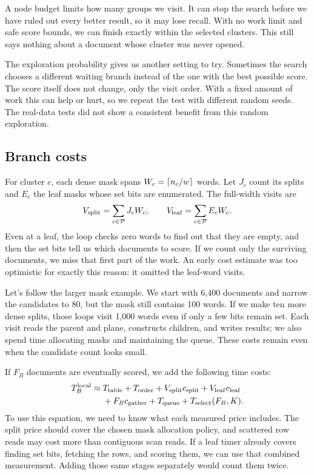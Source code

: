 A node budget limits how many groups we visit. It can stop the search before we have ruled
out every better result, so it may lose recall. With no work limit and safe score bounds,
we can finish exactly within the selected clusters. This still says nothing about a document
whose cluster was never opened.

The exploration probability gives us another setting to try. Sometimes the search chooses
a different waiting branch instead of the one with the best possible score. The score itself
does not change, only the visit order. With a fixed amount of work this can help or hurt,
so we repeat the test with different random seeds. The real-data tests did not show a
consistent benefit from this random exploration.

\subsection{Branch costs}
For cluster $c$, each dense mask spans $W_c=\left\lceil n_c/w\right\rceil$ words. Let $J_c$ count its splits
and $E_c$ the leaf masks whose set bits are enumerated. The full-width visits are
\begin{equation}
V_{\rm split}=\sum_{c\in\mathcal P}J_cW_c,
\qquad V_{\rm leaf}=\sum_{c\in\mathcal P}E_cW_c.
\label{eq:visits}
\end{equation}
Even at a leaf, the loop checks zero words to find out that they are empty, and then the set
bits tell us which documents to score. If we count only the surviving documents, we miss that
first part of the work. An early cost estimate was too optimistic for exactly this reason:
it omitted the leaf-word visits.

Let's follow the larger mask example. We start with 6,400 documents and narrow the candidates
to 80, but the mask still contains 100 words. If we make ten more dense splits, those loops
visit 1,000 words even if only a few bits remain set. Each visit reads the parent and plane,
constructs children, and writes results; we also spend time allocating masks and maintaining
the queue. These costs remain even when the candidate count looks small.

If $F_B$ documents are eventually scored, we add the following time costs:
\begin{equation}
\begin{split}
T_B^{\rm local}\approx{}&T_{\rm table}+T_{\rm order}
 +V_{\rm split}c_{\rm split}+V_{\rm leaf}c_{\rm leaf}\\
 &+F_Bc_{\rm gather}+T_{\rm queue}+T_{\rm select}(F_B,K).
\end{split}
\label{eq:branch-time}
\end{equation}
To use this equation, we need to know what each measured price includes. The split price
should cover the chosen mask allocation policy, and scattered row reads may cost more than
contiguous scan reads. If a leaf timer already covers finding set bits, fetching the rows,
and scoring them, we can use that combined measurement. Adding those same stages separately
would count them twice.

